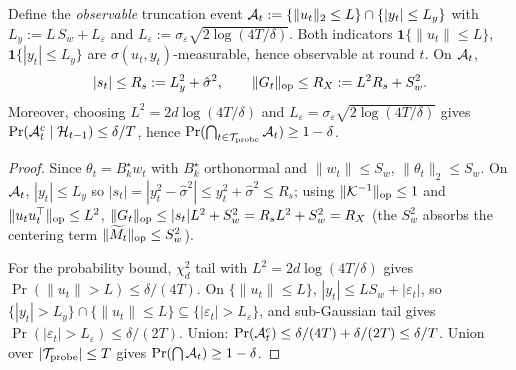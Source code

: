 \begin{lemma}
\label{lem:G_bound_conf}
Define the \emph{observable} truncation event
$\mathcal{A}_t := \{\|u_t\|_2\le L\}\cap\{|y_t|\le L_y\}$ with
$L_y := L\,S_w + L_\varepsilon$ and
$L_\varepsilon := \sigma_\varepsilon\sqrt{2\log(4T/\delta)}$.
Both indicators $\mathbf 1\{\|u_t\|\le L\}$, $\mathbf 1\{|y_t|\le L_y\}$
are $\sigma(u_t,y_t)$-measurable, hence observable at round $t$. On
$\mathcal{A}_t$,
\[
  |s_t|\le R_s := L_y^2 + \hat\sigma^2, \qquad
  \|G_t\|_{\mathrm{op}} \le R_X := L^2 R_s + S_w^2.
\]
Moreover, choosing $L^2=2d\log(4T/\delta)$ and
$L_\varepsilon=\sigma_\varepsilon\sqrt{2\log(4T/\delta)}$ gives
$\Pr(\mathcal{A}_t^c\mid\mathcal{H}_{t-1})\le\delta/T$, hence
$\Pr(\bigcap_{t\in\mathcal{T}_{\mathrm{probe}}}\mathcal{A}_t)\ge 1-\delta$.
\end{lemma}
\begin{proof}
Since $\theta_t=B_k^\star w_t$ with $B_k^\star$ orthonormal and
$\|w_t\|\le S_w$, $\|\theta_t\|_2\le S_w$. On $\mathcal{A}_t$,
$|y_t|\le L_y$ so $|s_t|=|y_t^2-\hat\sigma^2|\le y_t^2+\hat\sigma^2\le R_s$;
using $\|\mathcal K^{-1}\|_{\mathrm{op}}\le 1$ and $\|u_tu_t^\top\|_{\mathrm{op}}\le L^2$,
$\|G_t\|_{\mathrm{op}}\le|s_t|L^2+S_w^2=R_sL^2+S_w^2=R_X$ (the $S_w^2$
absorbs the centering term $\|\widetilde M_t\|_{\mathrm{op}}\le S_w^2$).

For the probability bound, $\chi^2_d$ tail with $L^2=2d\log(4T/\delta)$
gives $\Pr(\|u_t\|>L)\le\delta/(4T)$. On $\{\|u_t\|\le L\}$,
$|y_t|\le L S_w+|\varepsilon_t|$, so
$\{|y_t|>L_y\}\cap\{\|u_t\|\le L\}\subseteq\{|\varepsilon_t|>L_\varepsilon\}$,
and sub-Gaussian tail gives $\Pr(|\varepsilon_t|>L_\varepsilon)\le\delta/(2T)$.
Union: $\Pr(\mathcal{A}_t^c)\le\delta/(4T)+\delta/(2T)\le\delta/T$. Union over
$|\mathcal{T}_{\mathrm{probe}}|\le T$ gives $\Pr(\bigcap\mathcal{A}_t)\ge 1-\delta$.
\end{proof}

